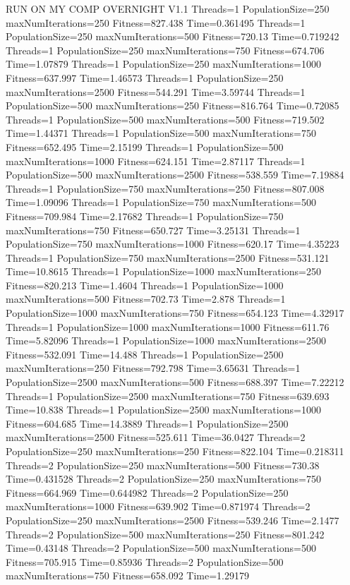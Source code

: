 \documentclass[10pt,letterpaper]{article}
\begin{document}
RUN ON MY COMP OVERNIGHT V1.1
Threads=1 PopulationSize=250 maxNumIterations=250 Fitness=827.438 Time=0.361495
Threads=1 PopulationSize=250 maxNumIterations=500 Fitness=720.13 Time=0.719242
Threads=1 PopulationSize=250 maxNumIterations=750 Fitness=674.706 Time=1.07879
Threads=1 PopulationSize=250 maxNumIterations=1000 Fitness=637.997 Time=1.46573
Threads=1 PopulationSize=250 maxNumIterations=2500 Fitness=544.291 Time=3.59744
Threads=1 PopulationSize=500 maxNumIterations=250 Fitness=816.764 Time=0.72085
Threads=1 PopulationSize=500 maxNumIterations=500 Fitness=719.502 Time=1.44371
Threads=1 PopulationSize=500 maxNumIterations=750 Fitness=652.495 Time=2.15199
Threads=1 PopulationSize=500 maxNumIterations=1000 Fitness=624.151 Time=2.87117
Threads=1 PopulationSize=500 maxNumIterations=2500 Fitness=538.559 Time=7.19884
Threads=1 PopulationSize=750 maxNumIterations=250 Fitness=807.008 Time=1.09096
Threads=1 PopulationSize=750 maxNumIterations=500 Fitness=709.984 Time=2.17682
Threads=1 PopulationSize=750 maxNumIterations=750 Fitness=650.727 Time=3.25131
Threads=1 PopulationSize=750 maxNumIterations=1000 Fitness=620.17 Time=4.35223
Threads=1 PopulationSize=750 maxNumIterations=2500 Fitness=531.121 Time=10.8615
Threads=1 PopulationSize=1000 maxNumIterations=250 Fitness=820.213 Time=1.4604
Threads=1 PopulationSize=1000 maxNumIterations=500 Fitness=702.73 Time=2.878
Threads=1 PopulationSize=1000 maxNumIterations=750 Fitness=654.123 Time=4.32917
Threads=1 PopulationSize=1000 maxNumIterations=1000 Fitness=611.76 Time=5.82096
Threads=1 PopulationSize=1000 maxNumIterations=2500 Fitness=532.091 Time=14.488
Threads=1 PopulationSize=2500 maxNumIterations=250 Fitness=792.798 Time=3.65631
Threads=1 PopulationSize=2500 maxNumIterations=500 Fitness=688.397 Time=7.22212
Threads=1 PopulationSize=2500 maxNumIterations=750 Fitness=639.693 Time=10.838
Threads=1 PopulationSize=2500 maxNumIterations=1000 Fitness=604.685 Time=14.3889
Threads=1 PopulationSize=2500 maxNumIterations=2500 Fitness=525.611 Time=36.0427
Threads=2 PopulationSize=250 maxNumIterations=250 Fitness=822.104 Time=0.218311
Threads=2 PopulationSize=250 maxNumIterations=500 Fitness=730.38 Time=0.431528
Threads=2 PopulationSize=250 maxNumIterations=750 Fitness=664.969 Time=0.644982
Threads=2 PopulationSize=250 maxNumIterations=1000 Fitness=639.902 Time=0.871974
Threads=2 PopulationSize=250 maxNumIterations=2500 Fitness=539.246 Time=2.1477
Threads=2 PopulationSize=500 maxNumIterations=250 Fitness=801.242 Time=0.43148
Threads=2 PopulationSize=500 maxNumIterations=500 Fitness=705.915 Time=0.85936
Threads=2 PopulationSize=500 maxNumIterations=750 Fitness=658.092 Time=1.29179
\end{document}
